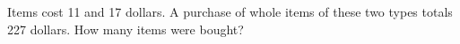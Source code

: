 Items cost 11 and 17 dollars. A purchase of whole items of these two types totals 227 dollars. How many items were bought?
